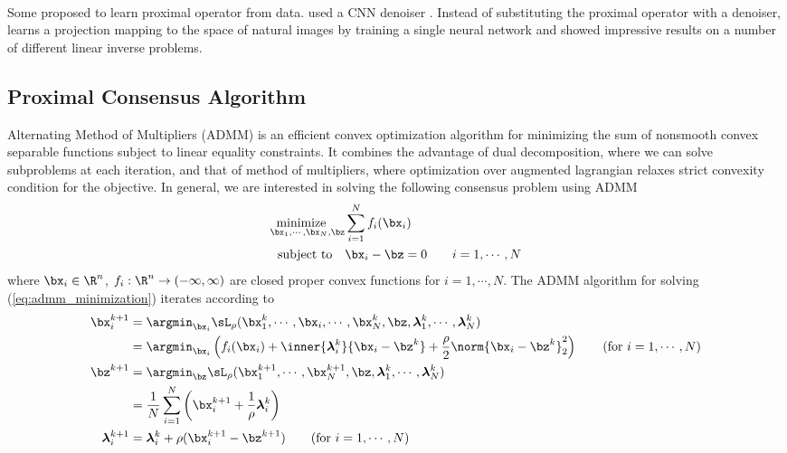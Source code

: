 \documentclass[11pt]{article}
\newcommand{\minimize}{\text{minimize}\quad}
\newcommand{\subjectto}{\text{subject to}\quad}
\newcommand{\blambda}{\boldsymbol{\lambda}}
\begin{document}
$ $\\ 
Some proposed to learn proximal operator from data. \cite{meinhardtLearningProximalOperators2017} used a CNN denoiser \cite{zhangGaussianDenoiserResidual2017}. Instead of substituting the proximal operator with a denoiser, \cite{changOneNetworkSolve2017} learns a projection mapping to the space of natural images by training a single neural network and showed impressive results on a number of different linear inverse problems.

\subsection{Proximal Consensus Algorithm}

Alternating Method of Multipliers (ADMM) is an efficient convex optimization algorithm for minimizing the sum of nonsmooth convex separable functions subject to linear equality constraints. It combines the advantage of dual decomposition, where we can solve subproblems at each iteration, and that of method of multipliers, where optimization over augmented lagrangian relaxes strict convexity condition for the objective.\cite{boydDistributedOptimizationStatistical2011} In general, we are interested in solving the following consensus problem using ADMM
\begin{equation}
    \label{eq:admm_minimization}
    \begin{aligned}
        \underset{\bx_1,\cdots,\bx_N,\bz}{\minimize}  & \sum_{i=1}^N f_i(\bx_i) \\
        \subjectto & \bx_i - \bz = 0 \quad\quad i = 1,\cdots,N \\
    \end{aligned}
\end{equation}
where $\bx_i\in\R^{n}$, $f_i: \R^{n} \to (-\infty,\infty)$ are closed proper convex functions for $i=1,\cdots,N$. The ADMM algorithm for solving (\ref{eq:admm_minimization}) iterates according to 
\begin{align*}
    \bx_i^{k+1} 
        &= \argmin_{\bx_i} \sL_{\rho}(\bx_1^k,\cdots,\bx_i,\cdots,\bx_N^k,\bz,\blambda_1^k,\cdots,\blambda_N^k) \\
        &= \argmin_{\bx_i} \left( f_i(\bx_i) + \inner{\blambda_i^k}{\bx_i-\bz^k} + \frac{\rho}{2} \norm{\bx_i-\bz^k}_2^2 \right) 
            \tag{for $i=1,\cdots,N$}\\
    \bz^{k+1}
        &= \argmin_{\bz} \sL_{\rho}(\bx_1^{k+1},\cdots,\bx_N^{k+1},\bz,\blambda_1^k,\cdots,\blambda_N^k) \\
        &= \frac{1}{N} \sum_{i=1}^N \left( \bx_i^{k+1} + \frac{1}{\rho}\blambda_i^k \right) \\
    \blambda_i^{k+1}
        &= \blambda_i^k + \rho(\bx_i^{k+1} - \bz^{k+1}) \tag{for $i=1,\cdots,N$}
\end{align*}
\end{document}
